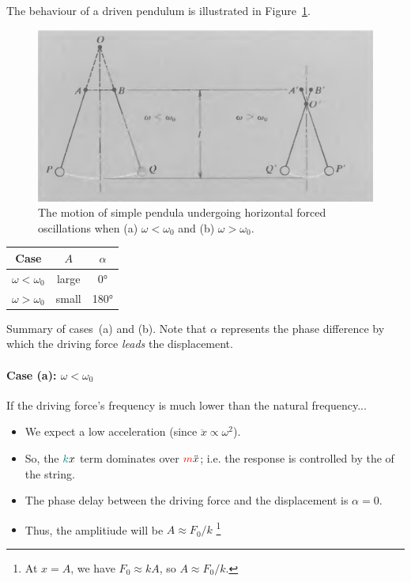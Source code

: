 The behaviour of a driven pendulum is illustrated in Figure~\ref{ch4:fig-no-damping-pendula}. 

\begin{figure}
	\centering
	\includegraphics[scale=0.6]{phys232/Ch4-forced-no-damping-pendula.png} 
	\caption{The motion of simple pendula undergoing horizontal forced oscillations when (a) $\omega<\omega_0$ and (b) $\omega>\omega_0$.}\label{ch4:fig-no-damping-pendula}
\end{figure}

\begin{margintable}
	\normalsize
	\begin{tabular}{ccc}
		\hline
		Case & $A$ & {$\alpha$}  \\
		\hline
		$\omega < \omega_0$ & large & 0° \\
		$\omega > \omega_0$ & small & 180° \\
		\hline
	\end{tabular}
	\vspace{0.5em}
	\caption{Summary of cases~(a) and (b). Note that $\alpha$ represents the phase difference by which the driving force \emph{leads} the displacement.}
	\label{ch4:tbl-no-damping-results}
\end{margintable}

\paragraph{Case (a): $\omega < \omega_0$}
If the driving force's frequency is much lower than the natural frequency...
\begin{itemize}
	\item We expect a low acceleration (since $\ddot{x} \propto \omega^2$).
	\item So, the $\textcolor{teal}{k}x$ term dominates over $\textcolor{red}{m}\ddot{x}$; i.e. the response is controlled by the  of the string.
	\item The phase delay between the driving force and the displacement is $\alpha=0$.
	\item Thus, the amplitiude will be $A\approx F_0/k$%
		\footnote{At $x=A$, we have $F_0 \approx kA$, so $A\approx F_0/k$.}
\end{itemize}



